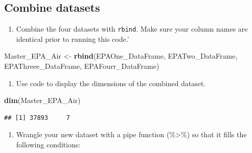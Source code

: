 \documentclass[
]{article}
\newenvironment{Shaded}{\begin{snugshade}}{\end{snugshade}}
\newcommand{\FunctionTok}[1]{\textcolor[rgb]{0.13,0.29,0.53}{\textbf{#1}}}
\newcommand{\NormalTok}[1]{#1}
\newcommand{\OtherTok}[1]{\textcolor[rgb]{0.56,0.35,0.01}{#1}}
\providecommand{\tightlist}{%
  \setlength{\itemsep}{0pt}\setlength{\parskip}{0pt}}
\begin{document}
\subsection{Combine datasets}\label{combine-datasets}

\begin{enumerate}
\def\labelenumi{\arabic{enumi}.}
\setcounter{enumi}{6}
\tightlist
\item
  Combine the four datasets with \texttt{rbind}. Make sure your column
  names are identical prior to running this code.'
\end{enumerate}

\begin{Shaded}
\begin{Highlighting}[]
\NormalTok{Master\_EPA\_Air }\OtherTok{\textless{}{-}} \FunctionTok{rbind}\NormalTok{(EPAOne\_DataFrame, EPATwo\_DataFrame, EPAThreee\_DataFrame, EPAFourr\_DataFrame)}
\end{Highlighting}
\end{Shaded}

\begin{enumerate}
\def\labelenumi{\arabic{enumi}.}
\setcounter{enumi}{7}
\tightlist
\item
  Use code to display the dimensions of the combined dataset.
\end{enumerate}

\begin{Shaded}
\begin{Highlighting}[]
\FunctionTok{dim}\NormalTok{(Master\_EPA\_Air)}
\end{Highlighting}
\end{Shaded}

\begin{verbatim}
## [1] 37893     7
\end{verbatim}

\begin{enumerate}
\def\labelenumi{\arabic{enumi}.}
\setcounter{enumi}{8}
\tightlist
\item
  Wrangle your new dataset with a pipe function (\%\textgreater\%) so
  that it fills the following conditions:
\end{enumerate}
\end{document}
